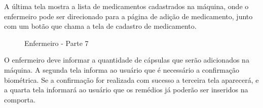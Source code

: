 A última tela mostra a lista de medicamentos cadastrados na máquina, onde o enfermeiro pode ser direcionado para a página de adição de medicamento, junto com um botão que chama a tela de cadastro de medicamento.

\begin{figure}[H]
    \centering
\end{figure}
    
\begin{figure}[H]
    \centering  
    \caption{Enfermeiro - Parte 7}
\end{figure}

O enfermeiro deve informar a quantidade de cápsulas que serão adicionados na máquina. A segunda tela informa ao usuário que é necessário a confirmação biométrica. Se a confirmação for realizada com sucesso a terceira tela aparecerá, e a quarta tela informará ao usuário que os remédios já poderão ser inseridos na comporta.

